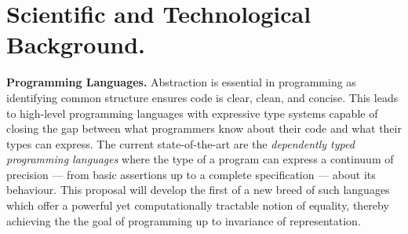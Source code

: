 \documentclass[a4paper,11pt]{article}
\newcommand{\eg}{{e.g.}\ }
\begin{document}
\vspace*{-0.1in} 





\vspace*{-0.1in} 
\section{Scientific and Technological Background.}
\vspace*{-0.1in} 

{\bf Programming Languages.} Abstraction is essential in programming
as identifying common structure ensures code is clear, clean, and
concise. This leads to high-level programming languages with
expressive type systems capable of closing the gap between what
programmers know about their code and what their types can express.
The current state-of-the-art are the {\em dependently typed
  programming languages} where the type of a program can express a
continuum of precision --- from basic assertions up to a complete
specification --- about its behaviour. This proposal will develop the
first of a new breed of such languages which offer a powerful yet
computationally tractable notion of equality, thereby achieving the
the goal of programming up to invariance of representation.
\end{document}
